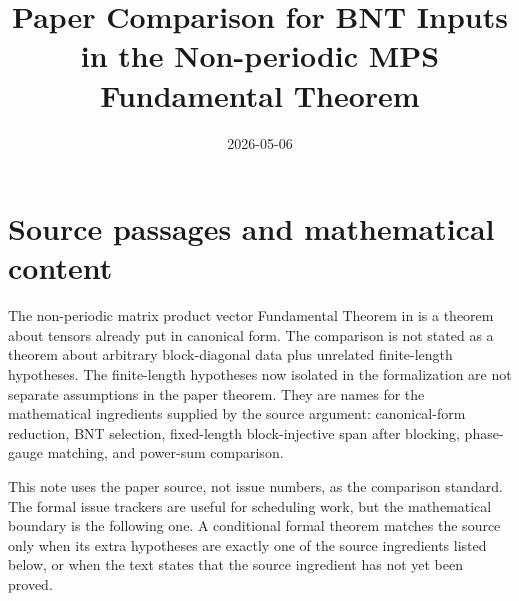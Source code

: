\documentclass{article}
\title{Paper Comparison for BNT Inputs in the Non-periodic MPS Fundamental Theorem}
\author{}
\date{2026-05-06}
\begin{document}
\maketitle

\section{Source passages and mathematical content}

The non-periodic matrix product vector Fundamental Theorem in
\cite{Cirac2016MPDO_arXiv,Cirac2017MPDO_AnnPhys,Cirac2021Matrix} is a theorem
about tensors already put in canonical form. The comparison is not stated as a
theorem about arbitrary block-diagonal data plus unrelated finite-length
hypotheses. The finite-length hypotheses now isolated in the formalization are
not separate assumptions in the paper theorem. They are names for the
mathematical ingredients supplied by the source argument: canonical-form
reduction, BNT selection, fixed-length block-injective span after blocking,
phase-gauge matching, and power-sum comparison.

This note uses the paper source, not issue numbers, as the comparison standard.
The formal issue trackers are useful for scheduling work, but the mathematical
boundary is the following one. A conditional formal theorem matches the source
only when its extra hypotheses are exactly one of the source ingredients listed
below, or when the text states that the source ingredient has not yet been
proved.
\end{document}
